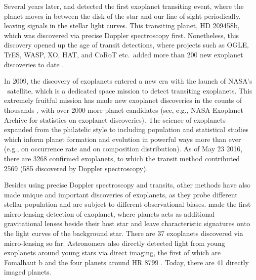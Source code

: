 Several years later, \cite{2000ApJ...529L..41H} and
\cite{2000ApJ...529L..45C} detected the first exoplanet transiting
event, where the planet moves in between the disk of the star and our
line of sight periodically, leaving signals in the stellar light
curves. This transiting planet, HD 209458b, which was discovered via
precise Doppler spectroscopy first. Nonetheless, this discovery opened
up the age of transit detections, where projects such as OGLE, TrES,
WASP, XO, HAT, and CoRoT etc.\ added more than 200 new exoplanet
discoveries to date \citep{2003Natur.421..507K, 2004ApJ...613L.153A,
2006MNRAS.372.1117C, 2006ApJ...648.1228M, 2007ApJ...656..552B}.

In 2009, the discovery of exoplanets entered a new era with the launch
of NASA's \kepler\ satellite, which is a dedicated space mission to
detect transiting exoplanets. This extremely fruitful mission has made
new exoplanet discoveries in the counts of thousands
\citep{2014ApJ...784...45R, 2016ApJ...822...86M}, with over 2000 more
planet candidates (see, e.g., NASA Exoplanet Archive for statistics on
exoplanet discoveries). The science of exoplanets expanded from the
philatelic style to including population and statistical studies which
inform planet formation and evolution in powerful ways more than ever
(e.g., \citealt{2013ApJ...766...81F} on occurrence rate and
\citealt{2015arXiv150407557W} on composition distribution). As of May
23 2016, there are 3268 confirmed exoplanets, to which the transit
method contributed 2569 (585 discovered by Doppler spectroscopy).

Besides using precise Doppler spectroscopy and transits, other methods
have also made unique and important discoveries of exoplanets, as they
probe different stellar population and are subject to different
observational biases. \cite{2004ApJ...606L.155B} made the first
micro-lensing detection of exoplanet, where planets acts as additional
gravitational lenses beside their host star and leave characteristic
signatures onto the light curves of the background star. There are 37
exoplanets discovered via micro-lensing so far. Astronomers also
directly detected light from young exoplanets around young stars via
direct imaging, the first of which are Fomalhaut b
\citep{2008Sci...322.1345K} and the four planets around HR 8799
\citep{2008Sci...322.1348M}. Today, there are 41 directly imaged
planets.

